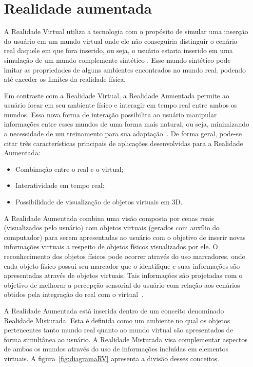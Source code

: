 \chapter{Realidade aumentada}
\label{cap:realidadeaumentada}	

	A Realidade Virtual utiliza a tecnologia com o propósito de simular uma inserção do usuário em um
	mundo virtual onde ele não conseguiria distinguir o cenário real daquele em que fora inserido, ou
	seja, o usuário estaria inserido em uma simulação de um mundo complemente sintético
	\cite{ronaldAzuma}. Esse mundo sintético pode imitar as propriedades de alguns ambientes
	encontrados no mundo real, podendo até exceder os limites da realidade física.
	
	Em contraste com a Realidade Virtual, a Realidade Aumentada permite ao usuário focar em seu
	ambiente físico e interagir em tempo real entre ambos os mundos. Essa nova forma de interação
	possibilita ao usuário manipular informações entre esses mundos de uma forma mais natural, ou seja,
	minimizando a necessidade de um treinamento para sua adaptação~\cite{kernerTori}. De forma geral,
	pode-se citar três características principais de aplicações desenvolvidas para a Realidade Aumentada:
	
	\begin{itemize}
	  \item Combinação entre o real e o virtual;
	  \item Interatividade em tempo real;
	  \item Possibilidade de visualização de objetos virtuais em 3D.
	\end{itemize}
	
	A Realidade Aumentada combina uma visão composta por cenas reais (visualizados pelo usuário) com
	objetos virtuais (gerados com auxílio do computador) para serem apresentadas ao usuário com o
	objetivo de inserir novas informações virtuais a respeito de objetos físicos visualizados por ele. O
	reconhecimento dos objetos físicos pode ocorrer através do uso marcadores, onde cada objeto físico possui
	seu marcador que o identifique e suas informações são apresentadas através de objetos virtuais.
	Tais informações são projetadas com o objetivo de melhorar a percepção sensorial do usuário com
	relação aos cenários obtidos pela integração do real com o virtual~\cite{tobias}.
	
	A Realidade Aumentada está inserida dentro de um conceito denominado Realidade Misturada. Esta
	é definida como um ambiente no qual os objetos pertencentes tanto mundo real quanto ao mundo
	virtual são apresentados de forma simultânea ao usuário. A Realidade Misturada visa complementar
	aspectos de ambos os mundos através do uso de informações incluídas em elementos virtuais. A
	figura~\ref{fig:diagramaRV} apresenta a divisão desses conceitos.
	
